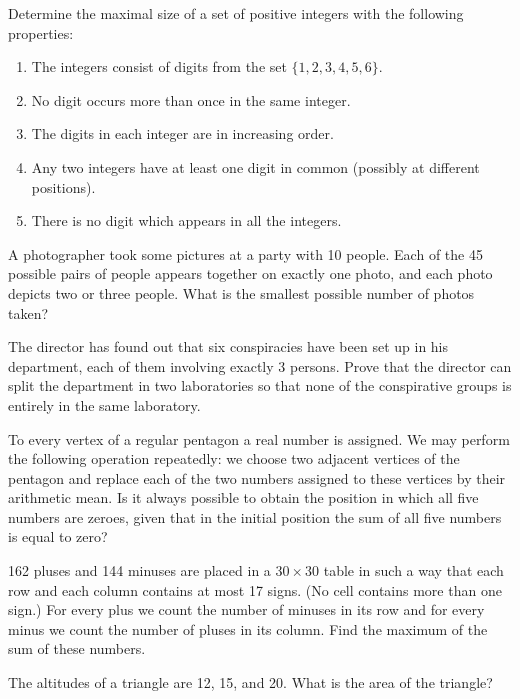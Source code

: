 \documentclass{bw06}
\begin{document}
\begin{problems}
\item Determine the maximal size of a set of positive integers with the following
properties:
\begin{enumerate}
\item The integers consist of digits from the set $\{1,2,3,4,5,6\}$.
\item No digit occurs more than once in the same integer.
\item The digits in each integer are  in increasing order.
\item Any two integers have at least one digit in common (possibly at different
  positions).
\item There is no digit which appears in all the integers.
\end{enumerate}

\item A photographer took some pictures at a party with 10 people. Each of
the 45 possible pairs of people appears together on exactly one
photo, and each photo depicts two or three people. What is the
smallest possible number of photos taken?

\item  The director has found out that six conspiracies have been set  
up in his department, each of them involving exactly 3 persons. Prove  
that the director can split the department in two laboratories so that  
none of the conspirative groups is entirely in the same laboratory.

\item  %
To  every vertex of a regular pentagon
a real number is assigned. We may
perform the following operation repeatedly: 
we choose two adjacent vertices of
the pentagon and replace each of the two numbers assigned to these
vertices by their arithmetic mean.  
Is it always possible to obtain the
position in which all five numbers are zeroes,
given that in the initial position the sum
of all five numbers is equal to zero?

\item 162 pluses and 144 minuses are placed in a $30\times 30$ 
table in such
a way that each row and each column contains at most 17 signs.
(No cell contains more than one sign.)
For every plus we count the number of minuses in its row and for every minus
we count the number of pluses in its column. Find the maximum of the sum
of these numbers.

\item The altitudes of a triangle are 12, 15, and 20. What is the area
of the triangle?


\end{problems}
\end{document}
